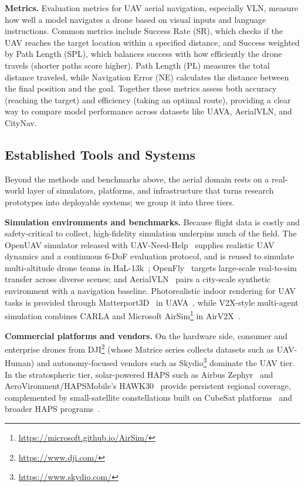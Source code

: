\textbf{Metrics.} Evaluation metrics for UAV aerial navigation, especially VLN, measure how well a model navigates a drone based on visual inputs and language instructions. Common metrics include Success Rate (SR), which checks if the UAV reaches the target location within a specified distance, and Success weighted by Path Length (SPL), which balances success with how efficiently the drone travels (shorter paths score higher). Path Length (PL) measures the total distance traveled, while Navigation Error (NE) calculates the distance between the final position and the goal. Together these metrics assess both accuracy (reaching the target) and efficiency (taking an optimal route), providing a clear way to compare model performance across datasets like UAVA, AerialVLN, and CityNav.


\subsection{Established Tools and Systems}
\label{subsec:p4-sec9-4-established-tools-and-systems}
Beyond the methods and benchmarks above, the aerial domain rests on a real-world layer of simulators, platforms, and infrastructure that turns research prototypes into deployable systems; we group it into three tiers.

\textbf{Simulation environments and benchmarks.} Because flight data is costly and safety-critical to collect, high-fidelity simulation underpins much of the field. The OpenUAV simulator released with UAV-Need-Help~\cite{wang2024towards} supplies realistic UAV dynamics and a continuous 6-DoF evaluation protocol, and is reused to simulate multi-altitude drone teams in HaL-13k~\cite{wu2025aeroduo}; OpenFly~\cite{gao2025openfly} targets large-scale real-to-sim transfer across diverse scenes; and AerialVLN~\cite{liu2023aerialvln} pairs a city-scale synthetic environment with a navigation baseline. Photorealistic indoor rendering for UAV tasks is provided through Matterport3D~\cite{chang2017matterport3d} in UAVA~\cite{albanis2020dronepose}, while V2X-style multi-agent simulation combines CARLA and Microsoft AirSim\footnote{\url{https://microsoft.github.io/AirSim/}} in AirV2X~\cite{gao2025airv2x}.

\textbf{Commercial platforms and vendors.} On the hardware side, consumer and enterprise drones from DJI\footnote{\url{https://www.dji.com/}} (whose Matrice series collects datasets such as UAV-Human) and autonomy-focused vendors such as Skydio\footnote{\url{https://www.skydio.com/}} dominate the UAV tier. In the stratospheric tier, solar-powered HAPS such as Airbus Zephyr~\cite{kothe2019flight} and AeroVironment/HAPSMobile's HAWK30~\cite{fladeland2019demonstrating} provide persistent regional coverage, complemented by small-satellite constellations built on CubeSat platforms~\cite{lemmer2017propulsion} and broader HAPS programs~\cite{gonzalo2018capabilities}.

